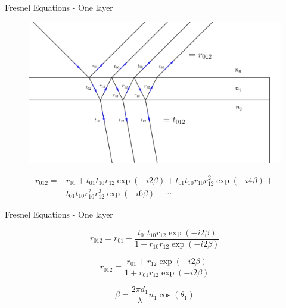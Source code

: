 \documentclass[10pt]{beamer}
\begin{document}
	\begin{frame}{Fresnel Equations - One layer}
	
	\begin{figure} 
		 \begin{center}
		   \includegraphics[width=\textwidth]{figreflre.png}
		 \end{center}
	\end{figure}
	\begin{align*}
	r_{012} = &r_{01} + t_{01}t_{10}r_{12}\exp(-i2\beta) + t_{01}t_{10}r_{10}r_{12}^2\exp(-i4\beta)+ \\ &t_{01}t_{10}r_{10}^2r_{12}^3\exp(-i6\beta)+ \cdots
	\end{align*} 
	
	\end{frame}
	
	\begin{frame}{Fresnel Equations - One layer}
	
	\begin{minipage}{0.47\textwidth}
	
	\begin{equation*} \label{eq:r012big}
	r_{012}=r_{01}+\frac{t_{01}t_{10}r_{12}\exp(-i2\beta)}{1-r_{10}r_{12}\exp(-i2\beta)}
	\end{equation*}
		
	\begin{equation*}\label{eq:2layerreflect}
	r_{012}= \frac{r_{01}+r_{12}\exp(-i2\beta)}{1+r_{01}r_{12}\exp(-i2\beta)}
	\end{equation*} 
	\end{minipage}
	\begin{minipage}{0.5\textwidth}
	\begin{equation*}
	\beta=\frac{2\pi d_1}{\lambda} n_1\cos(\theta_1)
	\end{equation*}
	\end{minipage}	
	\end{frame}
	
\end{document}
